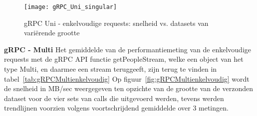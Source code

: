 \begin{figure}[ht]
    \centering
    \texttt{[image: gRPC\_Uni\_singular]}
    \caption{gRPC Uni - enkelvoudige requests: snelheid vs. datasets van vari\"erende grootte}
    \label{fig:gRPCUnienkelvoudig}
\end{figure}

\textbf{gRPC - Multi}\newline
Het gemiddelde van de performantiemeting van de enkelvoudige requests met de gRPC API functie getPeopleStream, welke een object van het type Multi, en daarmee een stream
teruggeeft, zijn terug te vinden in tabel~\ref{tab:gRPCMultienkelvoudig}
Op figuur~\ref{fig:gRPCMultienkelvoudig} wordt de snelheid in MB/sec weergegeven ten opzichte van de grootte van de verzonden dataset voor de vier sets van
calls die uitgevoerd werden, tevens werden trendlijnen voorzien volgens voortschrijdend gemiddelde over 3 metingen.\\

